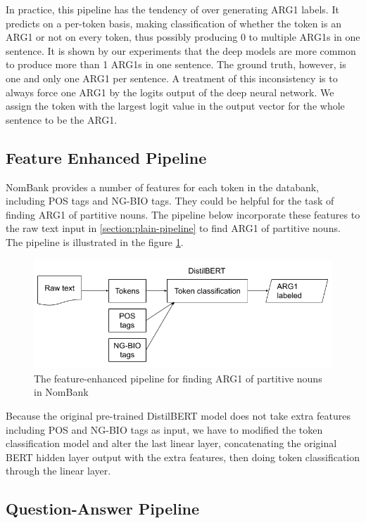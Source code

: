 \documentclass[11pt]{article}
\begin{document}
In practice, this pipeline has the tendency of over generating ARG1 labels. It predicts on a per-token basis, making classification of whether the token is an ARG1 or not on every token, thus possibly producing 0 to multiple ARG1s in one sentence. It is shown by our experiments that the deep models are more common to produce more than 1 ARG1s in one sentence. The ground truth, however, is one and only one ARG1 per sentence. A treatment of this inconsistency is to always force one ARG1 by the logits output of the deep neural network. We assign the token with the largest logit value in the output vector for the whole sentence to be the ARG1.

\subsection{Feature Enhanced Pipeline}

NomBank provides a number of features for each token in the databank, including POS tags and NG-BIO tags. They could be helpful for the task of finding ARG1 of partitive nouns. The pipeline below incorporate these features to the raw text input in \ref{section:plain-pipeline} to find ARG1 of partitive nouns. The pipeline is illustrated in the figure \ref{fig:enhanced-arg1-pipeline}.

\begin{figure}[h]
  \centering
  \includegraphics[width=\linewidth]{assets/enhanced-arg1-pipeline.png}
  \caption{The feature-enhanced pipeline for finding ARG1 of partitive nouns in NomBank}
  \label{fig:enhanced-arg1-pipeline}
\end{figure}

Because the original pre-trained DistilBERT model does not take extra features including POS and NG-BIO tags as input, we have to modified the token classification model and alter the last linear layer, concatenating the original BERT hidden layer output with the extra features, then doing token classification through the linear layer.

\subsection{Question-Answer Pipeline}
\end{document}
